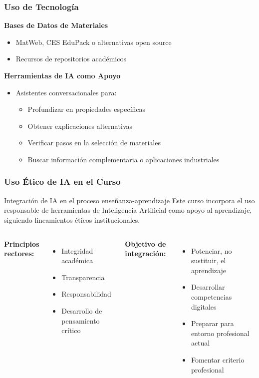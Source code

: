 \documentclass{beamer}
\begin{document}
\begin{frame}
    \frametitle{Uso de Tecnología}
    
    \textbf{Bases de Datos de Materiales}
    \begin{itemize}
        \item MatWeb, CES EduPack o alternativas open source
        \item Recursos de repositorios académicos
    \end{itemize}
    \vspace{0.3cm}
    
    \textbf{Herramientas de IA como Apoyo}
    \begin{itemize}
        \item Asistentes conversacionales para:
        \begin{itemize}
            \item Profundizar en propiedades específicas
            \item Obtener explicaciones alternativas
            \item Verificar pasos en la selección de materiales
            \item Buscar información complementaria o aplicaciones industriales
        \end{itemize}
    \end{itemize}
\end{frame}
\begin{frame}
    \frametitle{Uso Ético de IA en el Curso}
    
    \begin{block}{Integración de IA en el proceso enseñanza-aprendizaje}
        Este curso incorpora el uso responsable de herramientas de Inteligencia Artificial como apoyo al aprendizaje, siguiendo lineamientos éticos institucionales.
    \end{block}
    
    \begin{columns}[t]
        \textbf{Principios rectores:}
        \begin{itemize}
            \item Integridad académica
            \item Transparencia
            \item Responsabilidad
            \item Desarrollo de pensamiento crítico
        \end{itemize}
        
        \textbf{Objetivo de integración:}
        \begin{itemize}
            \item Potenciar, no sustituir, el aprendizaje
            \item Desarrollar competencias digitales
            \item Preparar para entorno profesional actual
            \item Fomentar criterio profesional
        \end{itemize}
    \end{columns}
\end{frame}
\end{document}
